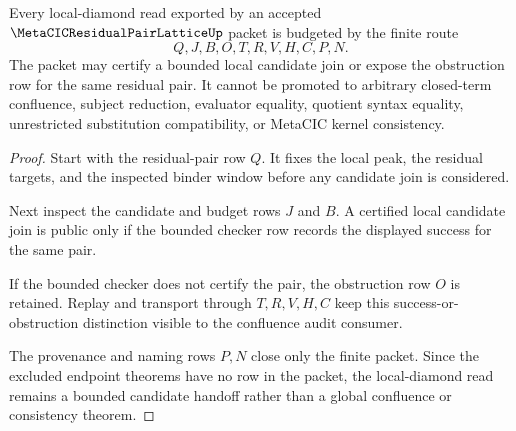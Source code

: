 \begin{theorem}
\label{thm:metacic-residual-pair-lattice-local-diamond-budget}
Every local-diamond read exported by an accepted $\MetaCICResidualPairLatticeUp$ packet is budgeted by the finite route
$$
Q,J,B,O,T,R,V,H,C,P,N .
$$
The packet may certify a bounded local candidate join or expose the obstruction row for the same residual pair. It cannot be promoted to arbitrary closed-term confluence, subject reduction, evaluator equality, quotient syntax equality, unrestricted substitution compatibility, or MetaCIC kernel consistency.
\end{theorem}
\begin{proof}
Start with the residual-pair row $Q$. It fixes the local peak, the residual targets, and the inspected binder window before any candidate join is considered.

Next inspect the candidate and budget rows $J$ and $B$. A certified local candidate join is public only if the bounded checker row records the displayed success for the same pair.

If the bounded checker does not certify the pair, the obstruction row $O$ is retained. Replay and transport through $T,R,V,H,C$ keep this success-or-obstruction distinction visible to the confluence audit consumer.

The provenance and naming rows $P,N$ close only the finite packet. Since the excluded endpoint theorems have no row in the packet, the local-diamond read remains a bounded candidate handoff rather than a global confluence or consistency theorem.
\end{proof}





